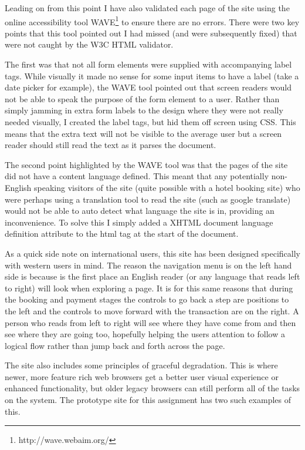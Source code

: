 \documentclass{article}
\begin{document}
Leading on from this point I have also validated each page of the site using the online accessibility tool WAVE\footnote{http://wave.webaim.org/} to ensure there are no errors. There were two key points that this tool pointed out I had missed (and were subsequently fixed) that were not caught by the W3C HTML validator. 

The first was that not all form elements were supplied with accompanying label tags. While visually it made no sense for some input items to have a label (take a date picker for example), the WAVE tool pointed out that screen readers would not be able to speak the purpose of the form element to a user. Rather than simply jamming in extra form labels to the design where they were not really needed visually, I created the label tags, but hid them off screen using CSS. This means that the extra text will not be visible to the average user but a screen reader should still read the text as it parses the document. 

The second point highlighted by the WAVE tool was that the pages of the site did not have a content language defined. This meant that any potentially non-English speaking visitors of the site (quite possible with a hotel booking site) who were perhaps using a translation tool to read the site (such as google translate) would not be able to auto detect what language the site is in, providing an inconvenience. To solve this I simply added a XHTML document language definition attribute to the html tag at the start of the document.

As a quick side note on international users, this site has been designed specifically with western users in mind. The reason the navigation menu is on the left hand side is because is the first place an English reader (or any language that reads left to right) will look when exploring a page. It is for this same reasons that during the booking and payment stages the controls to go back a step are positions to the left and the controls to move forward with the transaction are on the right. A person who reads from left to right will see where they have come from and then see where they are going too, hopefully helping the users attention to follow a logical flow rather than jump back and forth across the page.

The site also includes some principles of graceful degradation. This is where newer, more feature rich web browsers get a better user visual experience or enhanced functionality, but older legacy browsers can still perform all of the tasks on the system. The prototype site for this assignment has two such examples of this. 
\end{document}
